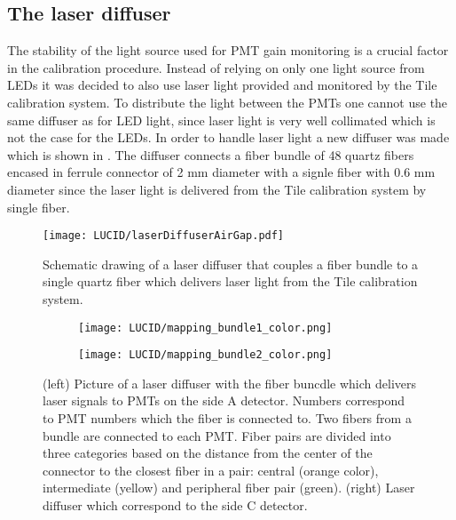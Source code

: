 
\subsection{The laser diffuser}
\label{subsec:laserDiffuser}

The stability of the light source used for PMT gain monitoring is a crucial factor in the calibration procedure.
Instead of relying on only one light source from LEDs it was decided to also use laser light
provided and monitored by the Tile calibration system. 
To distribute the light between the PMTs one cannot use the same diffuser as for LED light, 
since laser light is very well collimated which is not the case for the LEDs.
In order to handle laser light a new diffuser was made which is shown in .
The diffuser connects a fiber bundle of 48 quartz fibers encased in ferrule connector of 2 mm diameter with a signle fiber with 0.6 mm diameter
since the laser light is delivered from the Tile calibration system by single fiber.

\begin{figure}
\centering
\texttt{[image: LUCID/laserDiffuserAirGap.pdf]}
\caption{Schematic drawing of a laser diffuser that couples a fiber bundle to a single quartz fiber which delivers laser light from the Tile calibration system.}
\label{fig:laserDiffuserSchematics}
\end{figure}

\begin{figure}
\centering
\begin{subfigure}{.45\textwidth}
  \centering
  \texttt{[image: LUCID/mapping\_bundle1\_color.png]}
\end{subfigure}%
\begin{subfigure}{.45\textwidth}
  \centering
  \texttt{[image: LUCID/mapping\_bundle2\_color.png]}
\end{subfigure}
\caption{(left) Picture of a laser diffuser with the fiber buncdle which delivers laser signals to PMTs on the side A detector. 
Numbers correspond to PMT numbers which the fiber is connected to. 
Two fibers from a bundle are connected to each PMT. 
Fiber pairs are divided into three categories based on the distance from the center of the connector to the closest fiber 
in a pair: central (orange color), intermediate (yellow) and peripheral fiber pair (green).
(right) Laser diffuser which correspond to the side C detector.}
\label{fig:laserDiffuserMapping}
\end{figure}

